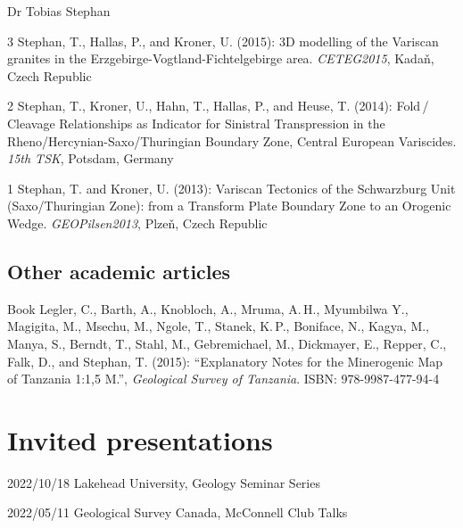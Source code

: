 \documentclass[10pt, paper=letter]{scrartcl} %
\begin{document}
\begin{cv}{\textsf{Dr Tobias Stephan}}
\begin{cvlist}{}
        \item[3] Stephan, T., Hallas, P., and Kroner, U. (2015): 3D modelling of the Variscan granites in the Erzgebirge-Vogtland-Fichtelgebirge area. \mbox{\textit{CETEG2015}}, Kada\v{n}, Czech Republic
        \item[2] Stephan, T., Kroner, U., Hahn, T., Hallas, P., and Heuse, T. (2014): Fold\,/ Cleavage Relationships as Indicator for Sinistral Transpression in the Rheno\-/Hercynian\--Saxo\-/Thuringian Boundary Zone, Central European Variscides. \textit{15th TSK}, Potsdam, Germany
        \item[1] Stephan, T. and Kroner, U. (2013): Variscan Tectonics of the Schwarzburg Unit (Saxo\-/Thuringian Zone): from a Transform Plate Boundary Zone to an Orogenic Wedge. \textit{GEOPilsen2013}, Plze\v{n}, Czech Republic
    \end{cvlist}

    \subsection{Other academic articles}
    \begin{cvlist}{}
        \item[Book] Legler, C., Barth, A., Knobloch, A., Mruma, A.\,H., Myumbilwa Y.,
        Magigita, M., Msechu, M., Ngole, T., Stanek, K.\,P., Boniface, N., Kagya, M.,
        Manya, S., Berndt, T., Stahl, M., Gebremichael, M., Dickmayer, E., Repper, C.,
        Falk, D., and Stephan, T. (2015): \enquote{Explanatory Notes for the
            Minerogenic Map of Tanzania 1:1,5 M.}, \textit{Geological Survey of Tanzania}.
        ISBN: 978-9987-477-94-4
    \end{cvlist}

    \section{Invited presentations}
    \begin{cvlist}{}
        \item[2022/10/18]{Lakehead University, Geology Seminar Series}
        \item[2022/05/11]{Geological Survey Canada, McConnell Club Talks}
    \end{cvlist}


\end{cv}
\end{document}
